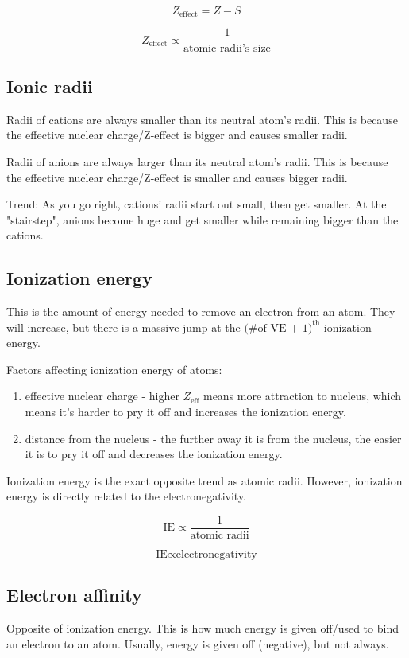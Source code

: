 \documentclass[letterpaper, 12pt]{article}
\begin{document}
	$$Z_{\text{effect}} = Z - S$$

	$$Z_{\text{effect}} \propto \frac{1}{\text{atomic radii's size}}$$

	\subsection{Ionic radii}
	Radii of cations are always smaller than its neutral atom's radii. This is because the effective nuclear charge/Z-effect is bigger and causes smaller radii.

	Radii of anions are always larger than its neutral atom's radii. This is because the effective nuclear charge/Z-effect is smaller and causes bigger radii.

	Trend: As you go right, cations' radii start out small, then get smaller. At the "stairstep", anions become huge and get smaller while remaining bigger than the cations.

	\subsection{Ionization energy}
	This is the amount of energy needed to remove an electron from an atom. They will increase, but there is a massive jump at the $\text{(\# of VE + 1)}^{\text{th}}$ ionization energy.

	Factors affecting ionization energy of atoms:
	\begin{enumerate}
		\item effective nuclear charge - higher $Z_{\text{eff}}$ means more attraction to nucleus, which means it's harder to pry it off and increases the ionization energy.
		\item distance from the nucleus - the further away it is from the nucleus, the easier it is to pry it off and decreases the ionization energy.
	\end{enumerate}

	Ionization energy is the exact opposite trend as atomic radii. However, ionization energy is directly related to the electronegativity.

	$$\text{IE} \propto \frac{1}{\text{atomic radii}}$$

	$$\text{IE} \propto \text{electronegativity}$$

	\subsection{Electron affinity}
	Opposite of ionization energy. This is how much energy is given off/used to bind an electron to an atom. Usually, energy is given off (negative), but not always.
\end{document}
